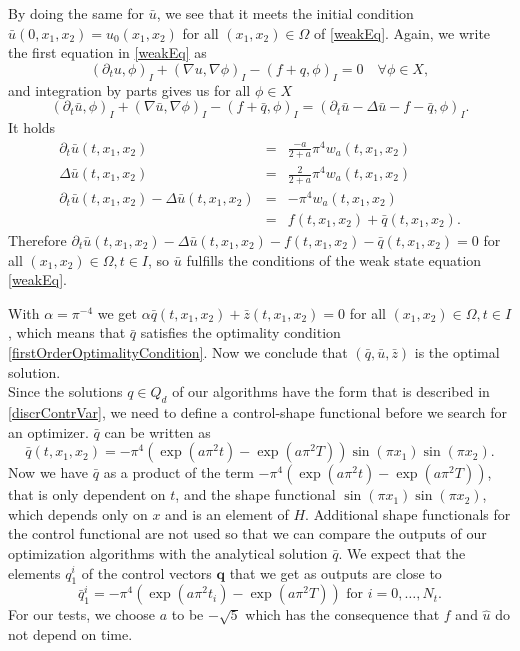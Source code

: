 By doing the same for $\bar{u}$, we see that it meets the initial condition $\bar{u}(0,x_1,x_2)=u_0(x_1,x_2)$ for all $(x_1,x_2)\in\Omega$ of \eqref{weakEq}. Again, we write the first equation in \eqref{weakEq} as
\begin{displaymath}
(\partial_tu,\phi)_I+(\nabla u,\nabla\phi)_I-(f+q,\phi)_I=0\quad\forall\phi\in X,
\end{displaymath}
and integration by parts gives us for all $\phi\in X$
\begin{displaymath}
(\partial_t\bar{u},\phi)_I+(\nabla \bar{u},\nabla\phi)_I-(f+\bar{q},\phi)_I=(\partial_t\bar{u}-\Delta\bar{u}-f-\bar{q},\phi)_I.
\end{displaymath}
It holds
\begin{eqnarray*}
\partial_t\bar{u}(t,x_1,x_2)&=&\frac{-a}{2+a}\pi^4w_a(t,x_1,x_2)\\
\Delta \bar{u}(t,x_1,x_2)&=&\frac{2}{2+a}\pi^4w_a(t,x_1,x_2)\\
\partial_t\bar{u}(t,x_1,x_2)-\Delta \bar{u}(t,x_1,x_2)&=&-\pi^4w_a(t,x_1,x_2)\\
&=&f(t,x_1,x_2)+\bar{q}(t,x_1,x_2).
\end{eqnarray*}
Therefore $\partial_t\bar{u}(t,x_1,x_2)-\Delta\bar{u}(t,x_1,x_2)-f(t,x_1,x_2)-\bar{q}(t,x_1,x_2)=0$ for all $(x_1,x_2)\in\Omega, t\in I$, so $\bar{u}$ fulfills the conditions of the weak state equation \eqref{weakEq}.

With $\alpha=\pi^{-4}$ we get $\alpha\bar{q}(t,x_1,x_2)+\bar{z}(t,x_1,x_2)=0$ for all $(x_1,x_2)\in\Omega, t\in I$, which means that $\bar{q}$ satisfies the optimality condition \eqref{firstOrderOptimalityCondition}. Now we conclude that $(\bar{q}, \bar{u}, \bar{z})$ is the optimal solution.\\

Since the solutions $q\in Q_d$ of our algorithms have the form that is described in \eqref{discrContrVar}, we need to define a control-shape functional before we search for an optimizer. $\bar{q}$ can be written as
\begin{displaymath}
\bar{q}(t,x_1,x_2)=-\pi^4(\exp(a\pi^2t)-\exp(a\pi^2T))\sin(\pi x_1)\sin(\pi x_2).
\end{displaymath}
Now we have $\bar{q}$ as a product of the term $-\pi^4(\exp(a\pi^2t)-\exp(a\pi^2T))$, that is only dependent on $t$, and the shape functional $\sin(\pi x_1)\sin(\pi x_2)$, which depends only on $x$ and is an element of $H$. Additional shape functionals for the control functional are not used so that we can compare the outputs of our optimization algorithms with the analytical solution $\bar{q}$. We expect that the elements $q^i_1$ of the control vectors $\mathbf{q}$ that we get as outputs are close to
\begin{equation}
\label{controlVectorElements}
\bar{q}^i_1=-\pi^4(\exp(a\pi^2t_i)-\exp(a\pi^2T))\text{ for }i=0,\dotsc,N_t.
\end{equation}
For our tests, we choose $a$ to be $-\sqrt{5}$ which has the consequence that $f$ and $\hat{u}$ do not depend on time.

